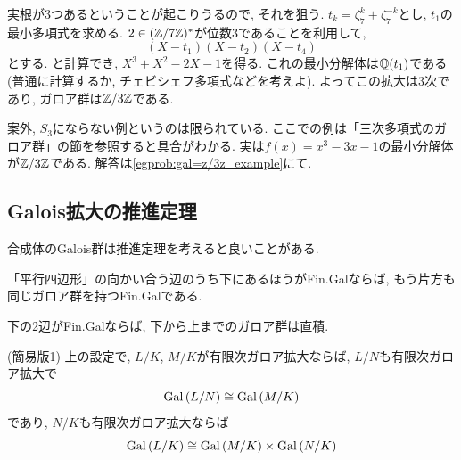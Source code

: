 \begin{egans}
実根が3つあるということが起こりうるので, それを狙う. $t_k=\zeta_7^k + \zeta_7^{-k}$とし, $t_1$の最小多項式を求める. $2\in (\mathbb{Z}/7\mathbb{Z})^{\ast}$が位数3であることを利用して,
\[(X-t_1)(X-t_2)(X-t_4)\]
とする.
と計算でき, $X^3 + X^2 - 2X - 1$を得る. これの最小分解体は$\mathbb{Q}(t_1)$である(普通に計算するか, チェビシェフ多項式などを考えよ). よってこの拡大は3次であり, ガロア群は$\mathbb{Z}/3\mathbb{Z}$である.
\end{egans}
\begin{egans} 案外, $S_3$にならない例というのは限られている.  ここでの例は「三次多項式のガロア群」の節を参照すると具合がわかる. 実は$f(x) = x^3-3x-1$の最小分解体が$\mathbb{Z}/3\mathbb{Z}$である. 解答は\ref{egprob:gal=z/3z_example}にて.
\end{egans}










\subsection{Galois拡大の推進定理}
合成体のGalois群は推進定理を考えると良いことがある.
\begin{point}
\ben
\item 「平行四辺形」の向かい合う辺のうち下にあるほうがFin.Galならば, もう片方も同じガロア群を持つFin.Galである.
\item 下の2辺がFin.Galならば, 下から上までのガロア群は直積.
\een
\end{point}
\begin{cor} (簡易版1)
上の設定で, $L/K$, $M/K$が有限次ガロア拡大ならば, $L/N$も有限次ガロア拡大で
\[\operatorname{Gal}{(L/N)}\cong \operatorname{Gal}{(M/K)}\]
であり, $N/K$も有限次ガロア拡大ならば
\[\operatorname{Gal}{(L/K)}\cong \operatorname{Gal}{(M/K)}\times \operatorname{Gal}{(N/K)}\]
\end{cor}

